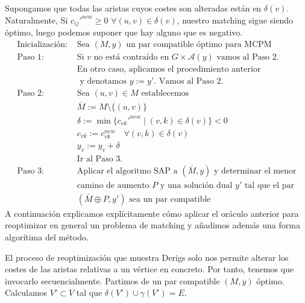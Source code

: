 \documentclass[twoside,a4paper,openright,12pt,tikz]{book}
\begin{document}
Supongamos que todas las aristas cuyos costes son alteradas están en $\delta(v)$. Naturalmente, Si $c_{ij}'^{new} \geq 0$ $\forall (u,v) \in \delta(v)$, nuestro matching sigue siendo óptimo, luego podemos suponer que hay alguno que es negativo.
\begin{align*}
\text{Inicialización: }& \text{Sea $(M,y)$ un par compatible óptimo para MCPM}\\
\text{Paso 1: }& \text{Si $v$ no está contraído en $G\times \mathcal{A}(y)$ vamos al Paso 2.}\\
&\text{En otro caso, aplicamos el procedimiento anterior}\\
&\text{ y denotamos $y:=y'$. Vamos al Paso 2.}\\
\text{Paso 2: }& \text{Sea $(u,v) \in M$ establecemos}\\
&\overline{M}:=M\setminus\{(u,v)\}\\
&\delta:=\min\{c_{vk}'^{new}\mid (v,k)\in \delta(v)\}<0\\
&c_{vk}:=c_{vk}^{new} \quad \forall (v,k)\in \delta (v)\\
&y_v:=y_v+\delta\\
&\text{Ir al Paso 3.}\\
\text{Paso 3: }&\text{Aplicar el algoritmo SAP a $(\overline{M},y)$ y determinar el menor}\\
&\text{camino de aumento $P$ y una solución dual $y'$ tal que el par}\\
&\text{$(\overline{M}\oplus P,y')$ sea un par compatible}
\end{align*}
A continuación explicamos explícitamente cómo aplicar el oráculo anterior para reoptimizar en general un problema de matching y añadimos además una forma algorítima del método.

El proceso de reoptimización que muestra Derigs solo nos permite alterar los costes de las aristas relativas a un vértice en concreto. Por tanto, tenemos que invocarlo secuencialmente. Partimos de un par compatible $(M,y)$ óptimo. Calculamos $V' \subset V$ tal que $\delta(V') \cup \gamma(V')= E$. 	
\end{document}
